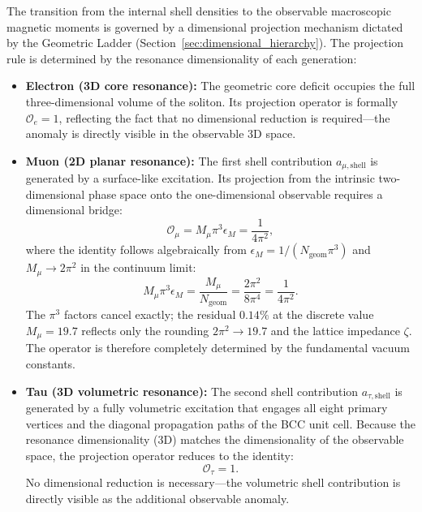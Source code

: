 \documentclass[10pt,a4paper]{article}
\begin{document}
The transition from the internal shell densities to the observable macroscopic 
magnetic moments is governed by a dimensional projection mechanism dictated by 
the Geometric Ladder (Section~\ref{sec:dimensional_hierarchy}). The projection 
rule is determined by the resonance dimensionality of each generation:

\begin{itemize}
	\item \textbf{Electron (3D core resonance):} The geometric core deficit 
	occupies the full three-dimensional volume of the soliton. Its projection 
	operator is formally $\mathcal{O}_e = 1$, reflecting the fact that no 
	dimensional reduction is required---the anomaly is directly visible in 
	the observable 3D space.
	
	\item \textbf{Muon (2D planar resonance):} The first shell contribution 
	$a_{\mu,\text{shell}}$ is generated by a surface-like excitation. Its 
	projection from the intrinsic two-dimensional phase space onto the 
	one-dimensional observable requires a dimensional bridge:
	\begin{equation}
		\mathcal{O}_\mu = M_\mu \pi^3 \epsilon_M = \frac{1}{4\pi^2},
		\label{eq:O_mu}
	\end{equation}
	where the identity follows algebraically from $\epsilon_M = 1/(N_{\text{geom}}\pi^3)$
	and $M_\mu \to 2\pi^2$ in the continuum limit:
	\begin{equation}
		M_\mu \pi^3 \epsilon_M
		=
		\frac{M_\mu}{N_{\text{geom}}}
		=
		\frac{2\pi^2}{8\pi^4}
		=
		\frac{1}{4\pi^2}.
		\label{eq:O_mu_identity}
	\end{equation}
	The $\pi^3$ factors cancel exactly; the residual $0.14\%$ at the discrete
	value $M_\mu = 19.7$ reflects only the rounding $2\pi^2 \to 19.7$ and the
	lattice impedance $\zeta$. The operator is therefore completely determined
	by the fundamental vacuum constants.
	
	\item \textbf{Tau (3D volumetric resonance):} The second shell contribution 
	$a_{\tau,\text{shell}}$ is generated by a fully volumetric excitation that 
	engages all eight primary vertices and the diagonal propagation paths of 
	the BCC unit cell. Because the resonance dimensionality (3D) matches the 
	dimensionality of the observable space, the projection operator reduces to 
	the identity:
	\begin{equation}
		\mathcal{O}_\tau = 1.
		\label{eq:O_tau}
	\end{equation}
	No dimensional reduction is necessary---the volumetric shell contribution 
	is directly visible as the additional observable anomaly.
\end{itemize}
\end{document}
